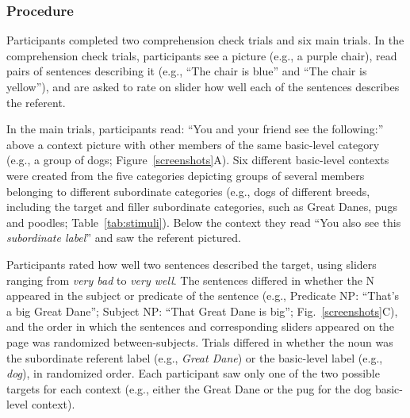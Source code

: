 \documentclass[10pt,letterpaper]{article}
\begin{document}
\subsubsection{Procedure}
Participants completed two comprehension check trials and six main trials. In the comprehension check trials, participants see a picture (e.g., a purple chair), read pairs of sentences describing it (e.g., ``The chair is blue'' and ``The chair is yellow''), and are asked to rate on slider how well each of the sentences describes the referent.

In the main trials, participants read: ``You and your friend see the following:'' above a context picture with other members of the same basic-level category (e.g., a group of dogs; Figure~\ref{screenshots}A). 
Six different basic-level contexts were created from the five categories depicting groups of several members belonging to different subordinate categories (e.g., dogs of different breeds, including the target and filler subordinate categories, such as Great Danes, pugs and poodles; Table~\ref{tab:stimuli}).
Below the context they read ``You also see this \emph{subordinate label}'' and saw the referent pictured.

Participants rated how well two sentences described the target, using sliders ranging from \textit{very bad} to \textit{very well}. The sentences differed in whether the N appeared in the subject or predicate of the sentence (e.g., Predicate NP: ``That's a big Great Dane''; Subject NP: ``That Great Dane is big''; Fig.~\ref{screenshots}C), and the order in which the sentences and corresponding sliders appeared on the page was randomized between-subjects. 
Trials differed in whether the noun was the subordinate referent label (e.g., \emph{Great Dane}) or the basic-level label (e.g., \emph{dog}), in randomized order. 
Each participant saw only one of the two possible targets for each context (e.g., either the Great Dane or the pug for the dog basic-level context).
\end{document}
